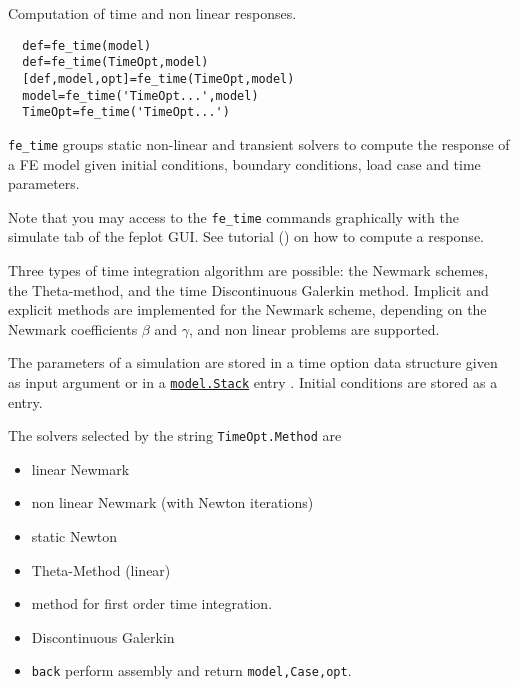 

\noindent Computation of time and non linear responses.

\rsyntax\begin{verbatim}
  def=fe_time(model)
  def=fe_time(TimeOpt,model)
  [def,model,opt]=fe_time(TimeOpt,model)
  model=fe_time('TimeOpt...',model)
  TimeOpt=fe_time('TimeOpt...')
\end{verbatim}


{\tt fe\_time} groups static non-linear and transient solvers to compute the response of a FE model given initial conditions, boundary conditions, load case and time parameters. 
\begin{SDT}
Note that you may access to the {\tt fe\_time} commands graphically with the simulate tab of the feplot GUI. See tutorial () on how to compute a response.
\end{SDT}


Three types of time integration algorithm are possible: the Newmark schemes, the Theta-method, and the time Discontinuous Galerkin method. 
Implicit and explicit methods are implemented for the Newmark scheme, depending on the Newmark coefficients $\beta$ and $\gamma$, and non linear problems are supported. 

The parameters of a simulation are stored in a time option data structure {} given as input argument or in a \hyperlink{stackref}{\tt model.Stack} entry .  Initial conditions are stored as a  entry.

The solvers selected by the string {\tt TimeOpt.Method} are
\begin{itemize}
\item {} linear Newmark
\item {} non linear Newmark (with Newton iterations) 
\item {} static Newton
\item {} Theta-Method (linear)
\item {} method for first order time integration.
\item {} Discontinuous Galerkin
\item {{\tt back}} perform assembly and return {\tt model,Case,opt}.
\end{itemize}

